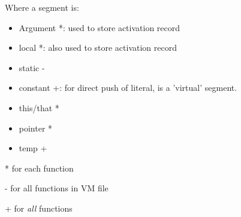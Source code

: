 \documentclass[12pt]{article}
\begin{document}
Where a segment is:
\begin{itemize}
  \item
    Argument *: used to store activation record
  \item
    local *: also used to store activation record
  \item
    static -
  \item
    constant +: for direct push of literal, is a 'virtual' segment.

  \item
    this/that * 

  \item
    pointer *

  \item
    temp +

\end{itemize}
* for each function

- for all functions in VM file

+ for \textit{all} functions
\end{document}
